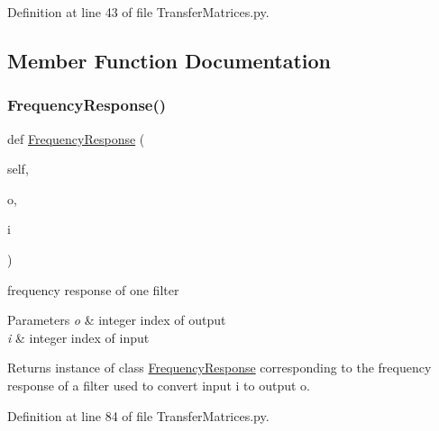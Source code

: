 Definition at line 43 of file Transfer\+Matrices.\+py.



\subsection{Member Function Documentation}
\mbox{\label{classSignalIntegrity_1_1FrequencyDomain_1_1TransferMatrices_1_1TransferMatrices_ae45a1bf3658b88340881c2be54c27dbe}} 
\subsubsection{\texorpdfstring{Frequency\+Response()}{FrequencyResponse()}}
{\footnotesize\ttfamily def \hyperlink{classSignalIntegrity_1_1FrequencyDomain_1_1FrequencyResponse_1_1FrequencyResponse}{Frequency\+Response} (\begin{DoxyParamCaption}\item[{}]{self,  }\item[{}]{o,  }\item[{}]{i }\end{DoxyParamCaption})}



frequency response of one filter 


\begin{DoxyParams}{Parameters}
{\em o} & integer index of output \\
\hline
{\em i} & integer index of input \\
\hline
\end{DoxyParams}
\begin{DoxyReturn}{Returns}
instance of class \hyperlink{namespaceSignalIntegrity_1_1FrequencyDomain_1_1FrequencyResponse}{Frequency\+Response} corresponding to the frequency response of a filter used to convert input i to output o. 
\end{DoxyReturn}


Definition at line 84 of file Transfer\+Matrices.\+py.

